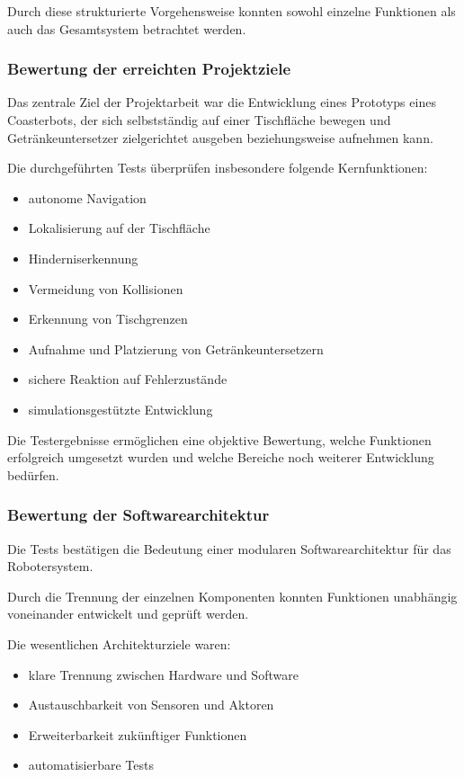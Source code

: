 \documentclass[
  a4paper,
  12pt,
  DIV=12,        %
  parskip=half,  %
  headings=small %
]{scrartcl}
\theoremstyle{definition}
\providecommand{\tightlist}{%
  \setlength{\itemsep}{0pt}\setlength{\parskip}{0pt}}
\theoremstyle{definition}
\begin{document}
Durch diese strukturierte Vorgehensweise konnten sowohl einzelne
Funktionen als auch das Gesamtsystem betrachtet werden.

\subsubsection{Bewertung der erreichten
Projektziele}\label{bewertung-der-erreichten-projektziele}

Das zentrale Ziel der Projektarbeit war die Entwicklung eines Prototyps
eines Coasterbots, der sich selbstständig auf einer Tischfläche bewegen
und Getränkeuntersetzer zielgerichtet ausgeben beziehungsweise aufnehmen
kann.

Die durchgeführten Tests überprüfen insbesondere folgende
Kernfunktionen:

\begin{itemize}
\tightlist
\item
  autonome Navigation
\item
  Lokalisierung auf der Tischfläche
\item
  Hinderniserkennung
\item
  Vermeidung von Kollisionen
\item
  Erkennung von Tischgrenzen
\item
  Aufnahme und Platzierung von Getränkeuntersetzern
\item
  sichere Reaktion auf Fehlerzustände
\item
  simulationsgestützte Entwicklung
\end{itemize}

Die Testergebnisse ermöglichen eine objektive Bewertung, welche
Funktionen erfolgreich umgesetzt wurden und welche Bereiche noch
weiterer Entwicklung bedürfen.

\subsubsection{Bewertung der
Softwarearchitektur}\label{bewertung-der-softwarearchitektur}

Die Tests bestätigen die Bedeutung einer modularen Softwarearchitektur
für das Robotersystem.

Durch die Trennung der einzelnen Komponenten konnten Funktionen
unabhängig voneinander entwickelt und geprüft werden.

Die wesentlichen Architekturziele waren:

\begin{itemize}
\tightlist
\item
  klare Trennung zwischen Hardware und Software
\item
  Austauschbarkeit von Sensoren und Aktoren
\item
  Erweiterbarkeit zukünftiger Funktionen
\item
  automatisierbare Tests
\end{itemize}
\end{document}
